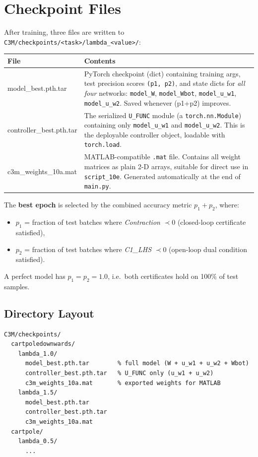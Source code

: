 \documentclass[11pt,a4paper]{article}
\begin{document}
\section{Checkpoint Files}
\label{sec:c3m_checkpoints}

After training, three files are written to \texttt{C3M/checkpoints/<task>/lambda\_<value>/}:

\begin{center}
\begin{tabular}{>{\ttfamily}p{4.5cm} p{9cm}}
\toprule
\normalfont\textbf{File} & \textbf{Contents} \\
\midrule
model\_best.pth.tar & PyTorch checkpoint (dict) containing training args, test precision scores \texttt{(p1, p2)}, and state dicts for \emph{all four} networks: \texttt{model\_W}, \texttt{model\_Wbot}, \texttt{model\_u\_w1}, \texttt{model\_u\_w2}.  Saved whenever (p1+p2) improves. \\[4pt]
controller\_best.pth.tar & The serialized \texttt{U\_FUNC} module (a \texttt{torch.nn.Module}) containing only \texttt{model\_u\_w1} and \texttt{model\_u\_w2}.  This is the deployable controller object, loadable with \texttt{torch.load}. \\[4pt]
c3m\_weights\_10a.mat & MATLAB-compatible \texttt{.mat} file.  Contains all weight matrices as plain 2-D arrays, suitable for direct use in \texttt{script\_10e}.  Generated automatically at the end of \texttt{main.py}. \\
\bottomrule
\end{tabular}
\end{center}

The \textbf{best epoch} is selected by the combined accuracy metric \(p_1 + p_2\), where:
\begin{itemize}[leftmargin=2em]
    \item \(p_1\) = fraction of test batches where \emph{Contraction} \(\prec 0\) (closed-loop certificate satisfied),
    \item \(p_2\) = fraction of test batches where \emph{C1\_LHS} \(\prec 0\) (open-loop dual condition satisfied).
\end{itemize}
A perfect model has \(p_1 = p_2 = 1.0\), i.e.\ both certificates hold on 100\% of test samples.

\subsection{Directory Layout}

\begin{lstlisting}[style=matlab]
C3M/checkpoints/
  cartpoledownwards/
    lambda_1.0/
      model_best.pth.tar        % full model (W + u_w1 + u_w2 + Wbot)
      controller_best.pth.tar   % U_FUNC only (u_w1 + u_w2)
      c3m_weights_10a.mat       % exported weights for MATLAB
    lambda_1.5/
      model_best.pth.tar
      controller_best.pth.tar
      c3m_weights_10a.mat
  cartpole/
    lambda_0.5/
      ...
\end{lstlisting}
\end{document}
